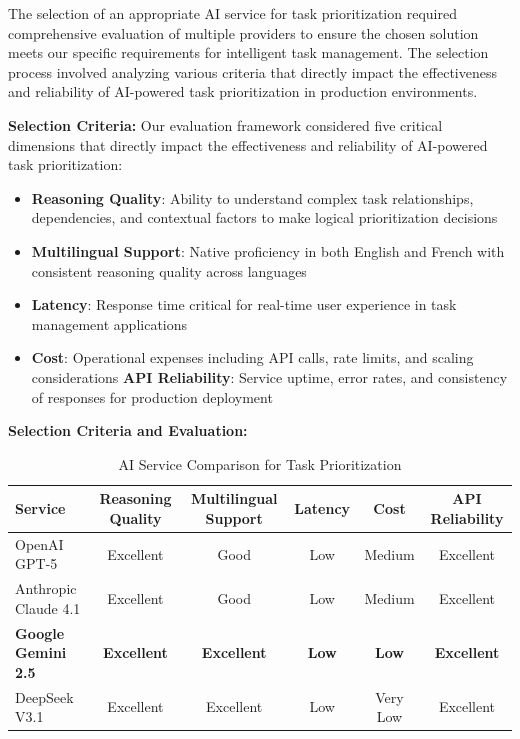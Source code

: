 The selection of an appropriate AI service for task prioritization required comprehensive evaluation of multiple providers to ensure the chosen solution meets our specific requirements for intelligent task management. The selection process involved analyzing various criteria that directly impact the effectiveness and reliability of AI-powered task prioritization in production environments.

\textbf{Selection Criteria:}
Our evaluation framework considered five critical dimensions that directly impact the effectiveness and reliability of AI-powered task prioritization:

\begin{itemize}
    \item \textbf{Reasoning Quality}: Ability to understand complex task relationships, dependencies, and contextual factors to make logical prioritization decisions
    \item \textbf{Multilingual Support}: Native proficiency in both English and French with consistent reasoning quality across languages
    \item \textbf{Latency}: Response time critical for real-time user experience in task management applications
    \item \textbf{Cost}: Operational expenses including API calls, rate limits, and scaling considerations
    \textbf{API Reliability}: Service uptime, error rates, and consistency of responses for production deployment
\end{itemize}

\textbf{Selection Criteria and Evaluation:}
\begin{table}[H]
\centering
\begin{tabular}{|l|c|c|c|c|c|}
\hline
\textbf{Service} & \textbf{Reasoning Quality} & \textbf{Multilingual Support} & \textbf{Latency} & \textbf{Cost} & \textbf{API Reliability} \\
\hline
OpenAI GPT-5 & Excellent & Good & Low & Medium & Excellent \\
\hline
Anthropic Claude 4.1 & Excellent & Good & Low & Medium & Excellent \\
\hline
\textbf{Google Gemini 2.5} & \textbf{Excellent} & \textbf{Excellent} & \textbf{Low} & \textbf{Low} & \textbf{Excellent} \\
\hline
DeepSeek V3.1 & Excellent & Excellent & Low & Very Low & Excellent \\
\hline
\end{tabular}
\caption{AI Service Comparison for Task Prioritization}
\end{table}

